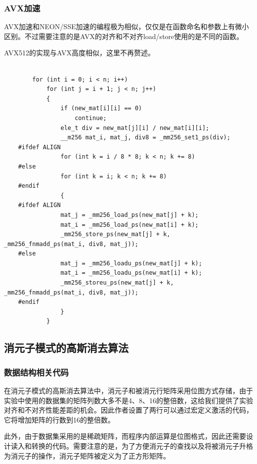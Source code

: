 \documentclass[a4paper]{article}
\begin{document}
\subsubsection{AVX加速}
AVX加速和NEON/SSE加速的编程极为相似，仅仅是在函数命名和参数上有微小区别。不过需要注意的是AVX的对齐和不对齐load/store使用的是不同的函数。

AVX512的实现与AVX高度相似，这里不再赘述。

\begin{verbatim}

        for (int i = 0; i < n; i++)
            for (int j = i + 1; j < n; j++)
            {
                if (new_mat[i][i] == 0)
                    continue;
                ele_t div = new_mat[j][i] / new_mat[i][i];
                __m256 mat_i, mat_j, div8 = _mm256_set1_ps(div);
    #ifdef ALIGN
                for (int k = i / 8 * 8; k < n; k += 8)
    #else
                for (int k = i; k < n; k += 8)
    #endif
                {
    #ifdef ALIGN
                mat_j = _mm256_load_ps(new_mat[j] + k);
                mat_i = _mm256_load_ps(new_mat[i] + k);
                _mm256_store_ps(new_mat[j] + k, _mm256_fnmadd_ps(mat_i, div8, mat_j));
    #else
                mat_j = _mm256_loadu_ps(new_mat[j] + k);
                mat_i = _mm256_loadu_ps(new_mat[i] + k);
                _mm256_storeu_ps(new_mat[j] + k, _mm256_fnmadd_ps(mat_i, div8, mat_j));
    #endif  
                }
            }
\end{verbatim}

\subsection{消元子模式的高斯消去算法}
\subsubsection{数据结构相关代码}
在消元子模式的高斯消去算法中，消元子和被消元行矩阵采用位图方式存储，由于实验中使用的数据集的矩阵列数大多不是4、8、16的整倍数，这给我们提供了实验对齐和不对齐性能差距的机会。因此作者设置了两行可以通过宏定义激活的代码，它将增加矩阵的行数到16的整倍数。

此外，由于数据集采用的是稀疏矩阵，而程序内部运算是位图格式，因此还需要设计读入和转换的代码。需要注意的是，为了方便消元子的查找以及将被消元子升格为消元子的操作，消元子矩阵被定义为了正方形矩阵。
\end{document}
